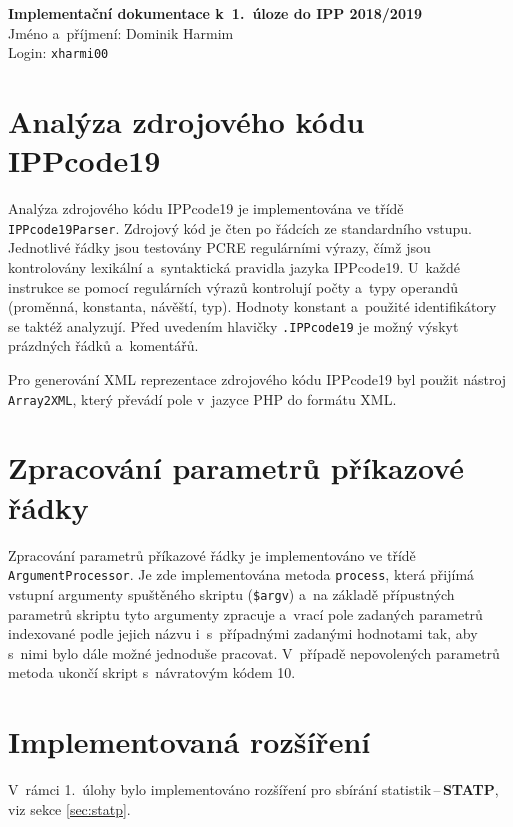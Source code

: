 \documentclass[11pt, a4paper]{article}
\begin{document}
    {\parindent 0pt \Large
        \textbf{Implementační dokumentace k~1.~úloze do IPP 2018/2019} \\
        Jméno a~příjmení: Dominik Harmim \\
        Login: \texttt{xharmi00}
    }
    
    
    \section{Analýza zdrojového kódu IPPcode19}
    
    Analýza zdrojového kódu IPPcode19 je implementována ve třídě
    \texttt{IPPcode19Parser}. Zdrojový kód je čten po řádcích ze
    standardního vstupu. Jednotlivé řádky jsou testovány PCRE regulárními
    výrazy, čímž jsou kontrolovány lexikální a~syntaktická pravidla jazyka
    IPPcode19. U~každé instrukce se pomocí regulárních výrazů kontrolují počty
    a~typy operandů (proměnná, konstanta, návěští, typ). Hodnoty konstant
    a~použité identifikátory se taktéž analyzují. Před uvedením hlavičky 
    \texttt{.IPPcode19} je možný výskyt prázdných řádků a~komentářů.
    
    Pro generování XML reprezentace zdrojového kódu IPPcode19
    byl použit nástroj \texttt{Array2XML}, který převádí pole v~jazyce PHP
    do formátu XML.
    
    
    \section{Zpracování parametrů příkazové řádky}
    
    Zpracování parametrů příkazové řádky je implementováno ve třídě
    \texttt{ArgumentProcessor}. Je zde implementována metoda \texttt{process},
    která přijímá vstupní argumenty spuštěného skriptu (\texttt{\$argv}) 
    a~na základě přípustných parametrů skriptu tyto argumenty zpracuje
    a~vrací pole zadaných parametrů indexované podle jejich názvu 
    i~s~případnými zadanými hodnotami tak, aby s~nimi bylo dále možné
    jednoduše pracovat. V~případě nepovolených parametrů metoda ukončí
    skript s~návratovým kódem 10.
    
    
    \section{Implementovaná rozšíření}
    
    V~rámci 1.~úlohy bylo implementováno rozšíření pro sbírání 
    statistik\,--\,\textbf{STATP}, viz sekce \ref{sec:statp}.
    
\end{document}
